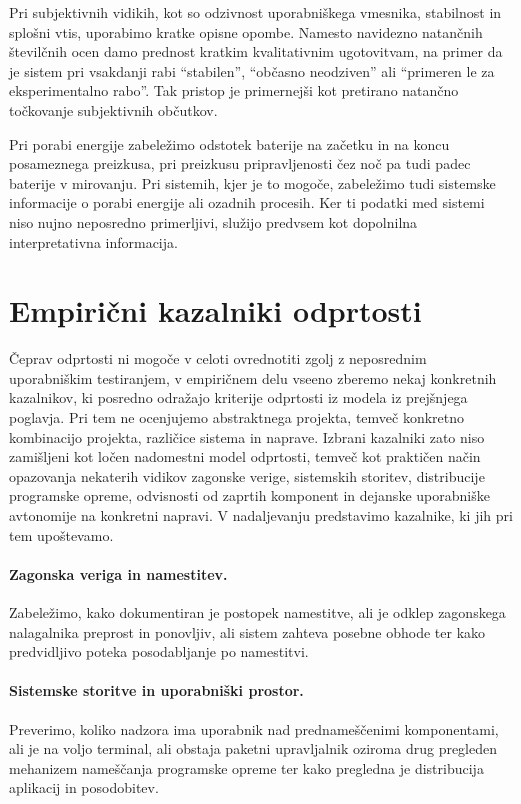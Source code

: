 \documentclass[a4paper,12pt,openright]{book}
\begin{document}
Pri subjektivnih vidikih, kot so odzivnost uporabniškega vmesnika, stabilnost in splošni vtis, uporabimo kratke opisne opombe.
Namesto navidezno natančnih številčnih ocen damo prednost kratkim kvalitativnim ugotovitvam, na primer da je sistem pri vsakdanji rabi \enquote{stabilen}, \enquote{občasno neodziven} ali \enquote{primeren le za eksperimentalno rabo}.
Tak pristop je primernejši kot pretirano natančno točkovanje subjektivnih občutkov.

Pri porabi energije zabeležimo odstotek baterije na začetku in na koncu posameznega preizkusa, pri preizkusu pripravljenosti čez noč pa tudi padec baterije v mirovanju.
Pri sistemih, kjer je to mogoče, zabeležimo tudi sistemske informacije o porabi energije ali ozadnih procesih.
Ker ti podatki med sistemi niso nujno neposredno primerljivi, služijo predvsem kot dopolnilna interpretativna informacija.

\section{Empirični kazalniki odprtosti}
\label{sec:empiricni_indikatorji_odprtosti}

Čeprav odprtosti ni mogoče v celoti ovrednotiti zgolj z neposrednim uporabniškim testiranjem, v empiričnem delu vseeno zberemo nekaj konkretnih kazalnikov, ki posredno odražajo kriterije odprtosti iz modela iz prejšnjega poglavja.
Pri tem ne ocenjujemo abstraktnega projekta, temveč konkretno kombinacijo projekta, različice sistema in naprave.
Izbrani kazalniki zato niso zamišljeni kot ločen nadomestni model odprtosti, temveč kot praktičen način opazovanja nekaterih vidikov zagonske verige, sistemskih storitev, distribucije programske opreme, odvisnosti od zaprtih komponent in dejanske uporabniške avtonomije na konkretni napravi.
V nadaljevanju predstavimo kazalnike, ki jih pri tem upoštevamo.

\paragraph{Zagonska veriga in namestitev.}
Zabeležimo, kako dokumentiran je postopek namestitve, ali je odklep zagonskega nalagalnika preprost in ponovljiv, ali sistem zahteva posebne obhode ter kako predvidljivo poteka posodabljanje po namestitvi.

\paragraph{Sistemske storitve in uporabniški prostor.}
Preverimo, koliko nadzora ima uporabnik nad prednameščenimi komponentami, ali je na voljo terminal, ali obstaja paketni upravljalnik oziroma drug pregleden mehanizem nameščanja programske opreme ter kako pregledna je distribucija aplikacij in posodobitev.
\end{document}
